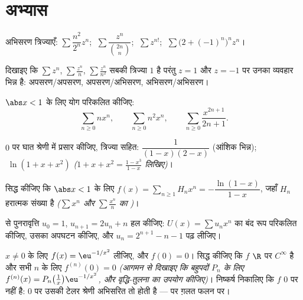 \section{अभ्यास}

\begin{exercise}[$\star$]\label{exo:b2:powerseries:1}
अभिसरण त्रिज्याएँ: $\sum \dfrac{n^2}{2^n}z^n$; $\;\sum \dfrac{z^n}{\binom{2n}{n}}$; $\;\sum z^{n!}$; $\;\sum \bigl(2 + (-1)^n\bigr)^n z^n$।
\end{exercise}

\begin{exercise}[$\star$]\label{exo:b2:powerseries:2}
दिखाइए कि $\sum z^n$, $\sum \frac{z^n}{n}$, $\sum \frac{z^n}{n^2}$ सबकी त्रिज्या $1$ है परंतु $z = 1$ और $z = -1$ पर उनका
व्यवहार भिन्न है: अपसरण/अपसरण, अपसरण/अभिसरण, अभिसरण/अभिसरण।
\end{exercise}

\begin{exercise}[$\star$]\label{exo:b2:powerseries:3}
$\abs x < 1$ के लिए योग परिकलित कीजिए:
\[
\sum_{n\geq0} n x^n,
\qquad
\sum_{n\geq0} n^2 x^n,
\qquad
\sum_{n\geq0} \frac{x^{2n+1}}{2n+1} .
\]
\end{exercise}

\begin{exercise}[$\star\star$]\label{exo:b2:powerseries:4}
$0$ पर घात श्रेणी में प्रसार कीजिए, त्रिज्या सहित: $\dfrac{1}{(1-x)(2-x)}$ (आंशिक भिन्न); $\;\ln(1 + x + x^2)$
\emph{($1 + x + x^2
= \frac{1 - x^3}{1 - x}$ लिखिए)}।
\end{exercise}

\begin{exercise}[$\star\star$]\label{exo:b2:powerseries:5}
सिद्ध कीजिए कि $\abs x < 1$ के लिए $f(x) = \sum_{n\geq1} H_n x^n = -\dfrac{\ln(1 -
x)}{1 - x}$, जहाँ $H_n$ हरात्मक संख्या है \emph{($\sum x^n$ और
$\sum \frac{x^n}{n}$ का )}।
\end{exercise}

\begin{exercise}[$\star\star$]\label{exo:b2:powerseries:6}
 से पुनरावृत्ति $u_0 = 1$, $u_{n+1} =
2u_n + n$ हल कीजिए: $U(x) = \sum u_nx^n$ का बंद रूप परिकलित कीजिए,
उसका अपघटन कीजिए, और $u_n = 2^{n+1} - n - 1$ पढ़ लीजिए।
\end{exercise}

\begin{exercise}[$\star\star$]\label{exo:b2:powerseries:7}
$x \neq 0$ के लिए $f(x) = \eu^{-1/x^2}$ लीजिए, और $f(0) = 0$। सिद्ध कीजिए कि $f$ $\R$ पर $C^\infty$ है और सभी
$n$ के लिए $f^{(n)}(0) = 0$ \emph{(आगमन से दिखाइए कि बहुपदों $P_n$ के लिए $f^{(n)}(x) = P_n\bigl(\frac1x\bigr)
\eu^{-1/x^2}$, और
वृद्धि-तुलना का उपयोग कीजिए)}। निष्कर्ष निकालिए कि $f$ $0$ पर 
नहीं है: $0$ पर उसकी टेलर श्रेणी अभिसरित तो होती है --- पर ग़लत फलन पर।
\end{exercise}

